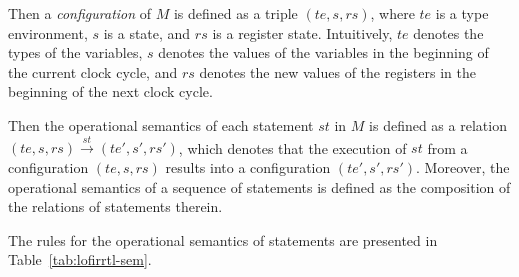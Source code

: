 Then a \emph{configuration} of $M$ is defined as a triple $(te, s, rs)$, where $te$ is a type environment, $s$ is a state, and $rs$ is a register state. Intuitively, $te$ denotes the types of the variables, $s$ denotes the values of the variables in the beginning of the current clock cycle, and $rs$ denotes the new values of the registers in the beginning of the next clock cycle. 

Then the operational semantics of each statement $st$ in $M$ is defined as a relation $(te, s, rs) \xrightarrow{st} (te', s', rs')$, which denotes that the execution of $st$ from a configuration $(te, s, rs)$ results into a configuration $(te', s', rs')$. Moreover, the operational semantics of a sequence of statements is defined as the composition of the relations of statements therein. 

The rules for the operational semantics of statements are presented in Table~\ref{tab:lofirrtl-sem}.

